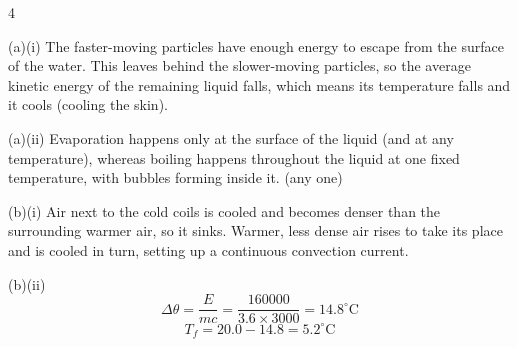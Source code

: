 \begin{question}{4}
\markscheme
{}
\endms

\exemplar
(a)(i) The faster-moving particles have enough energy to escape from the surface of the water. This leaves behind the slower-moving particles, so the average kinetic energy of the remaining liquid falls, which means its temperature falls and it cools (cooling the skin).

(a)(ii) Evaporation happens only at the surface of the liquid (and at any temperature), whereas boiling happens throughout the liquid at one fixed temperature, with bubbles forming inside it. (any one)

(b)(i) Air next to the cold coils is cooled and becomes denser than the surrounding warmer air, so it sinks. Warmer, less dense air rises to take its place and is cooled in turn, setting up a continuous convection current.

(b)(ii) $$ \Delta\theta = \frac{E}{mc} = \frac{160000}{3.6 \times 3000} = 14.8^{\circ}\text{C} $$
$$ T_f = 20.0 - 14.8 = 5.2^{\circ}\text{C} $$
\endexemplar
\end{question}

